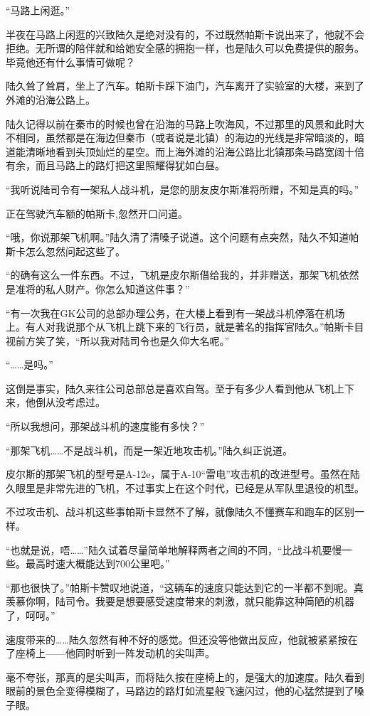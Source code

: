 “马路上闲逛。”

半夜在马路上闲逛的兴致陆久是绝对没有的，不过既然帕斯卡说出来了，他就不会拒绝。无所谓的陪伴就和给她安全感的拥抱一样，也是陆久可以免费提供的服务。毕竟他还有什么事情可做呢？

陆久耸了耸肩，坐上了汽车。帕斯卡踩下油门，汽车离开了实验室的大楼，来到了外滩的沿海公路上。

陆久记得以前在秦市的时候也曾在沿海的马路上吹海风，不过那里的风景和此时大不相同，虽然都是在海边但秦市（或者说是北镇）的海边的光线是非常暗淡的，暗道能清晰地看到头顶灿烂的星空。而上海外滩的沿海公路比北镇那条马路宽阔十倍有余，而且马路上的路灯把这里照耀得犹如白昼。

“我听说陆司令有一架私人战斗机，是您的朋友皮尔斯准将所赠，不知是真的吗。”

正在驾驶汽车额的帕斯卡,忽然开口问道。

“哦，你说那架飞机啊。”陆久清了清嗓子说道。这个问题有点突然，陆久不知道帕斯卡怎么忽然问起这些了。

“的确有这么一件东西。不过，飞机是皮尔斯借给我的，并非赠送，那架飞机依然是准将的私人财产。你怎么知道这件事？”

“有一次我在GK公司的总部办理公务，在大楼上看到有一架战斗机停落在机场上。有人对我说那个从飞机上跳下来的飞行员，就是著名的指挥官陆久。”帕斯卡目视前方笑了笑，“所以我对陆司令也是久仰大名呢。”

“……是吗。”

这倒是事实，陆久来往公司总部总是喜欢自驾。至于有多少人看到他从飞机上下来，他倒从没考虑过。

“所以我想问，那架战斗机的速度能有多快？”

“那架飞机……不是战斗机，而是一架近地攻击机。”陆久纠正说道。

皮尔斯的那架飞机的型号是A-12e，属于A-10“雷电”攻击机的改进型号。虽然在陆久眼里是非常先进的飞机，不过事实上在这个时代，已经是从军队里退役的机型。

不过攻击机、战斗机这些事帕斯卡显然不了解，就像陆久不懂赛车和跑车的区别一样。

“也就是说，唔……”陆久试着尽量简单地解释两者之间的不同，“比战斗机要慢一些。最高时速大概能达到700公里吧。”

“那也很快了。”帕斯卡赞叹地说道，“这辆车的速度只能达到它的一半都不到呢。真羡慕你啊，陆司令。我要是想要感受速度带来的刺激，就只能靠这种简陋的机器了，呵呵。”

速度带来的……陆久忽然有种不好的感觉。但还没等他做出反应，他就被紧紧按在了座椅上——他同时听到一阵发动机的尖叫声。

毫不夸张，那真的是尖叫声，而将陆久按在座椅上的，是强大的加速度。陆久看到眼前的景色全变得模糊了，马路边的路灯如流星般飞速闪过，他的心猛然提到了嗓子眼。

